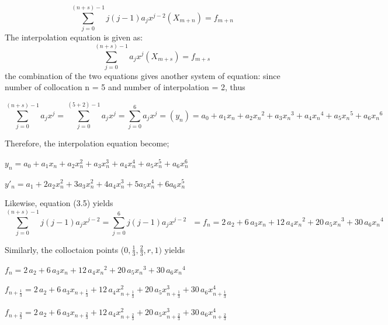 \documentclass[12pt]{report}
\begin{document}
\begin{equation}
\sum_{j=0}^{(n+s)-1} j(j-1)a_{j}x^{j-2}(X_{m+n})= f_{m+n}
\end{equation}
The interpolation equation is given as:
\begin{equation}
\sum_{j=0}^{(n+s)-1} a_{j}x^{j}(X_{m+s})= f_{m+s}
\end{equation}
the combination of the two equations gives another system of equation:
since number of collocation n = 5 and number of interpolation = 2, thus

\begin{equation}
\sum_{j=0}^{(n+s)-1} a_{j}x^{j}= \sum_{j=0}^{(5+2)-1} a_{j}x^{j}=\sum_{j=0}^{6} a_{j}x^{j}=(y_{n})= a_{{0}}+a_{{1}} x_{{n}}+a_{{2}} {x_{{n}}}^{2}+a_{{3}} {
	x_{{n}}}^{3}+a_{{4}} {x_{{n}}}^{4}+a_{{5}} {x_{{n}}}^{5}+a_{
	{6}} {x_{{n}}}^{6}
\end{equation}

Therefore, the interpolation equation become;

$y_{n}=a_{0}+a_{1}x_{n}+a_{2}x^{2}_{n}+a_{3}x^{3}_{n}+a_{4}x^{4}_{n}+a_{5}x^{5}_{n}+a_{6}x^{6}_{n}$
\vspace{10pt}

$y'_{n}=a_{1}+2a_{2}x^{2}_{n}+3a_{3}x^{2}_{n}+4a_{4}x^{3}_{n}+5a_{5}x^{4}_{n}+6a_{6}x^{5}_{n}$
\vspace{10pt}


\vspace{10pt}

\noindent Likewise, equation (3.5) yields
$$\sum_{j=0}^{(n+s)-1} j(j-1)a_{j}x^{j-2}=\sum_{j=0}^{6} j(j-1)a_{j}x^{j-2} \ \ \ = f_n = 2\,a_{{2}}+6\,a_{{3}} x_{{n}}+12\,a_{{4}} {x_{{n}}}^{2}+20\,
a_{{5}} {x_{{n}}}^{3}+30\,a_{{6}} {x_{{n}}}^{4}
$$

\noindent Similarly, the colloctaion points ($0, \frac{1}{3},\frac{2}{3}, r, 1)$ yields

\vspace{10pt}
$f_n = 2\,a_{{2}}+6\,a_{{3}} x_{{n}}+12\,a_{{4}} {x_{{n}}}^{2}+20\,
a_{{5}} {x_{{n}}}^{3}+30\,a_{{6}} {x_{{n}}}^{4}$

\vspace{10pt}
$f_{n+\frac{1}{3}} = 2\,a_{2}+6\,a_{3} x_{{n+\frac{1}{3}}}+12\,a_{{4}}{x^{2}_{{n+\frac{1}{3}}}}+20\,
a_{{5}} {x^{3}_{{n+\frac{1}{3}}}}+30\,a_{{6}} {x^{4}_{{n+\frac{1}{3}}}}$


\vspace{10pt}
$f_{n+\frac{2}{3}} = 2\,a_{2}+6\,a_{3} x_{{n+\frac{2}{3}}}+12\,a_{{4}}{x^{2}_{{n+\frac{2}{3}}}}+20\,
a_{{5}} {x^{3}_{{n+\frac{2}{3}}}}+30\,a_{{6}} {x^{4}_{{n+\frac{2}{3}}}}$
\end{document}
